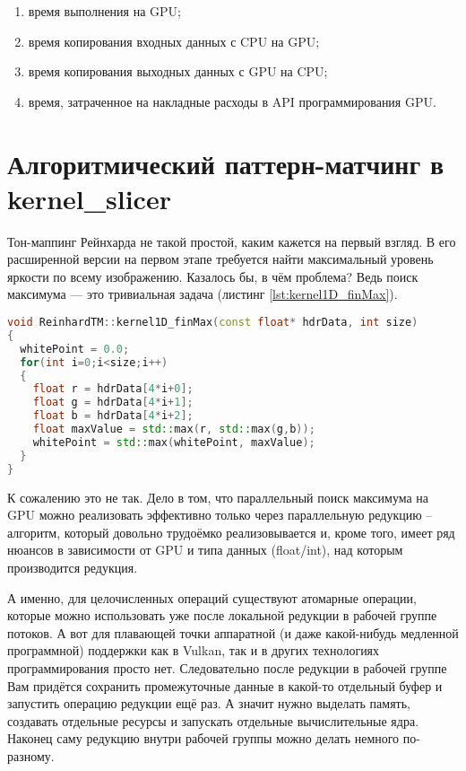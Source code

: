 \documentclass[11pt,fleqn,english,russian]{report} %
\begin{document}
\begin{enumerate}
\item время выполнения на GPU;
\item время копирования входных данных с CPU на GPU;
\item время копирования выходных данных с GPU на CPU;
\item время, затраченное на накладные расходы в API программирования GPU.
\end{enumerate}

\section{Алгоритмический паттерн-матчинг в kernel\_slicer}

Тон-маппинг Рейнхарда не такой простой, каким кажется на первый взгляд. В его расширенной версии на первом этапе требуется найти максимальный уровень яркости по всему изображению. Казалось бы, в чём проблема? Ведь поиск максимума --- это тривиальная задача (листинг \ref{lst:kernel1D_finMax}).

\begin{lstlisting}[language=C++, 
  	               caption=вычислительное ядро поиска максимума с алгоритмическим паттерном редукции, 
	               label=lst:kernel1D_finMax]	
void ReinhardTM::kernel1D_finMax(const float* hdrData, int size)
{
  whitePoint = 0.0;
  for(int i=0;i<size;i++)
  {
    float r = hdrData[4*i+0];
    float g = hdrData[4*i+1];
    float b = hdrData[4*i+2];
    float maxValue = std::max(r, std::max(g,b));
    whitePoint = std::max(whitePoint, maxValue);
  }  
}
\end{lstlisting}

К сожалению это не так. Дело в том, что параллельный поиск максимума на GPU можно реализовать эффективно только через параллельную редукцию -- алгоритм, который довольно трудоёмко реализовывается и, кроме того, имеет ряд нюансов в зависимости от GPU и типа данных (float/int), над которым производится редукция. 

А именно, для целочисленных операций существуют атомарные операции, которые можно использовать уже после локальной редукции в рабочей группе потоков. А вот для плавающей точки аппаратной (и даже какой-нибудь медленной программной) поддержки как в Vulkan, так и в других технологиях программирования просто нет. Следовательно после редукции в рабочей группе Вам придётся сохранить промежуточные данные в какой-то отдельный буфер и запустить операцию редукции ещё раз. А значит нужно выделать память, создавать отдельные ресурсы и запускать отдельные вычислительные ядра. Наконец саму редукцию внутри рабочей группы можно делать немного по-разному.
\end{document}
